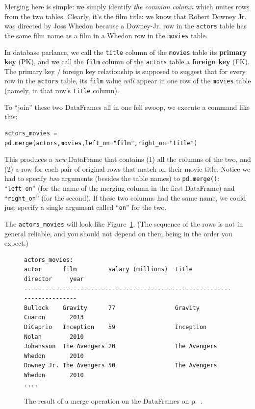 Merging here is simple: we simply identify \textit{the common column} which
unites rows from the two tables. Clearly, it's the film title: we know that
Robert Downey Jr. was directed by Joss Whedon because a Downey-Jr. row in the
\texttt{actors} table has the same film name as a film in a Whedon row in the
\texttt{movies} table.

In database parlance, we call the \texttt{title} column of the \texttt{movies}
table its \textbf{primary key} (PK), and we call the \texttt{film} column of
the \texttt{actors} table a \textbf{foreign key} (FK). The primary key /
foreign key relationship is supposed to suggest that for every row in the
\texttt{actors} table, its \texttt{film} value \textit{will} appear in one row
of the \texttt{movies} table (namely, in that row's \texttt{title} column).

To ``join'' these two DataFrames all in one fell swoop, we execute a command
like this:

\begin{Verbatim}[fontsize=\small,samepage=true,frame=single]
actors_movies = pd.merge(actors,movies,left_on="film",right_on="title")
\end{Verbatim}

This produces a \textit{new} DataFrame that contains (1) all the columns of
the two, and (2) a row for each pair of original rows that match on their
movie title. Notice we had to specify \textit{two} arguments (besides the
table names) to \texttt{pd.merge()}: ``\texttt{left\_on}'' (for the name of the
merging column in the first DataFrame) and ``\texttt{right\_on}'' (for the
second). If these two columns had the same name, we could just specify a
single argument called ``\texttt{on}'' for the two.

The \texttt{actors\_movies} will look like Figure~\ref{fig:merge}. (The
sequence of the rows is not in general reliable, and you should not depend on
them being in the order you expect.)

\begin{figure}[ht]
\begin{Verbatim}[fontsize=\small,samepage=true,frame=none]
                            actors_movies:
actor      film         salary (millions)  title         director     year
--------------------------------------------------------------------------
Bullock    Gravity      77                 Gravity       Cuaron       2013
DiCaprio   Inception    59                 Inception     Nolan        2010
Johansson  The Avengers 20                 The Avengers  Whedon       2010
Downey Jr. The Avengers 50                 The Avengers  Whedon       2010
....
\end{Verbatim}
\caption{The result of a merge operation on the DataFrames on p.~\pageref{originalDFs}.}
\label{fig:merge}
\end{figure}

